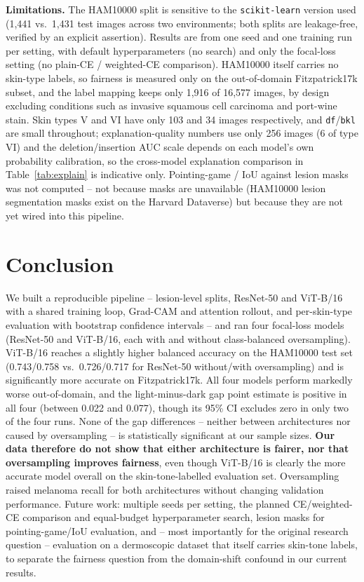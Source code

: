 \documentclass[twoside,a4paper,11pt]{article}
\begin{document}
\textbf{Limitations.} The HAM10000 split is sensitive to the
\texttt{scikit-learn} version used (1{,}441 vs.\ 1{,}431 test images
across two environments; both splits are leakage-free, verified by an
explicit assertion). Results are from one seed and one training run per
setting, with default hyperparameters (no search) and only the
focal-loss setting (no plain-CE / weighted-CE comparison). HAM10000
itself carries no skin-type labels, so fairness is measured only on
the out-of-domain Fitzpatrick17k subset, and the label mapping keeps
only 1{,}916 of 16{,}577 images, by design excluding conditions such as
invasive squamous cell carcinoma and port-wine stain. Skin types V and
VI have only 103 and 34 images respectively, and \texttt{df}/\texttt{bkl}
are small throughout; explanation-quality numbers use only 256 images
(6 of type VI) and the deletion/insertion AUC scale depends on each
model's own probability calibration, so the cross-model explanation
comparison in Table~\ref{tab:explain} is indicative only. Pointing-game
/ IoU against lesion masks was not computed -- not because masks are
unavailable (HAM10000 lesion segmentation masks exist on the Harvard
Dataverse) but because they are not yet wired into this pipeline.

\section{Conclusion}
\label{sec:conclusion}

We built a reproducible pipeline -- lesion-level splits, ResNet-50 and
ViT-B/16 with a shared training loop, Grad-CAM and attention rollout,
and per-skin-type evaluation with bootstrap confidence intervals -- and
ran four focal-loss models (ResNet-50 and ViT-B/16, each with and
without class-balanced oversampling). ViT-B/16 reaches a slightly
higher balanced accuracy on the HAM10000 test set (0.743/0.758 vs.\
0.726/0.717 for ResNet-50 without/with oversampling) and is
significantly more accurate on Fitzpatrick17k. All four models perform
markedly worse out-of-domain, and the light-minus-dark gap point
estimate is positive in all four (between 0.022 and 0.077), though its
95\% CI excludes zero in only two of the four runs. None of the gap
differences -- neither
between architectures nor caused by oversampling -- is statistically
significant at our sample sizes. \textbf{Our data therefore do not
show that either architecture is fairer, nor that oversampling improves
fairness}, even though ViT-B/16 is clearly the more accurate model
overall on the skin-tone-labelled evaluation set. Oversampling raised
melanoma recall for both architectures without changing validation
performance. Future work: multiple seeds per setting, the planned
CE/weighted-CE comparison and equal-budget hyperparameter search,
lesion masks for pointing-game/IoU evaluation, and -- most importantly
for the original research question -- evaluation on a dermoscopic
dataset that itself carries skin-tone labels, to separate the fairness
question from the domain-shift confound in our current results.
\end{document}
